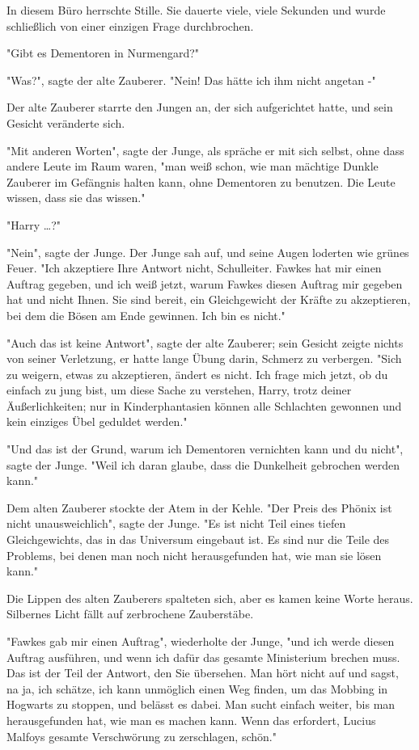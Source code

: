 {In diesem Büro herrschte Stille. Sie dauerte viele, viele Sekunden und wurde schließlich von einer einzigen Frage durchbrochen.

"Gibt es Dementoren in Nurmengard?"

"Was?", sagte der alte Zauberer. "Nein! Das hätte ich ihm nicht angetan -"

Der alte Zauberer starrte den Jungen an, der sich aufgerichtet hatte, und sein Gesicht veränderte sich.

"Mit anderen Worten", sagte der Junge, als spräche er mit sich selbst, ohne dass andere Leute im Raum waren, "man weiß schon, wie man mächtige Dunkle Zauberer im Gefängnis halten kann, ohne Dementoren zu benutzen. Die Leute wissen, dass sie das wissen."

"Harry …?"

"Nein", sagte der Junge. Der Junge sah auf, und seine Augen loderten wie grünes Feuer. "Ich akzeptiere Ihre Antwort nicht, Schulleiter. Fawkes hat mir einen Auftrag gegeben, und ich weiß jetzt, warum Fawkes diesen Auftrag mir gegeben hat und nicht Ihnen. Sie sind bereit, ein Gleichgewicht der Kräfte zu akzeptieren, bei dem die Bösen am Ende gewinnen. Ich bin es nicht."

"Auch das ist keine Antwort", sagte der alte Zauberer; sein Gesicht zeigte nichts von seiner Verletzung, er hatte lange Übung darin, Schmerz zu verbergen. "Sich zu weigern, etwas zu akzeptieren, ändert es nicht. Ich frage mich jetzt, ob du einfach zu jung bist, um diese Sache zu verstehen, Harry, trotz deiner Äußerlichkeiten; nur in Kinderphantasien können alle Schlachten gewonnen und kein einziges Übel geduldet werden."

"Und das ist der Grund, warum ich Dementoren vernichten kann und du nicht", sagte der Junge. "Weil ich daran glaube, dass die Dunkelheit gebrochen werden kann."

Dem alten Zauberer stockte der Atem in der Kehle. "Der Preis des Phönix ist nicht unausweichlich", sagte der Junge. "Es ist nicht Teil eines tiefen Gleichgewichts, das in das Universum eingebaut ist. Es sind nur die Teile des Problems, bei denen man noch nicht herausgefunden hat, wie man sie lösen kann."

Die Lippen des alten Zauberers spalteten sich, aber es kamen keine Worte heraus. Silbernes Licht fällt auf zerbrochene Zauberstäbe.

"Fawkes gab mir einen Auftrag", wiederholte der Junge, "und ich werde diesen Auftrag ausführen, und wenn ich dafür das gesamte Ministerium brechen muss. Das ist der Teil der Antwort, den Sie übersehen. Man hört nicht auf und sagst, na ja, ich schätze, ich kann unmöglich einen Weg finden, um das Mobbing in Hogwarts zu stoppen, und belässt es dabei. Man sucht einfach weiter, bis man herausgefunden hat, wie man es machen kann. Wenn das erfordert, Lucius Malfoys gesamte Verschwörung zu zerschlagen, schön."

}
